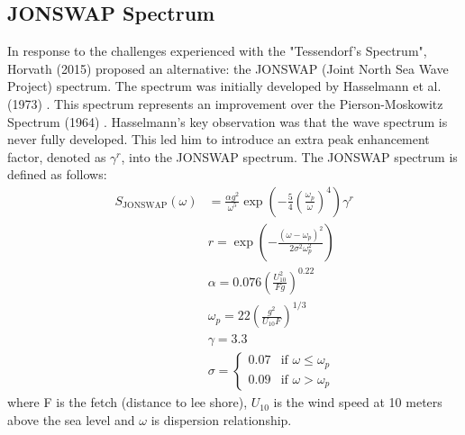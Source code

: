 \subsection{JONSWAP Spectrum}
In response to the challenges experienced with the "Tessendorf's Spectrum", Horvath (2015) \cite{horvath2015} proposed an alternative: the JONSWAP (Joint North Sea Wave Project) spectrum. The spectrum was initially developed by Hasselmann et al. (1973) \cite{hasselmann1973}. This spectrum represents an improvement over the Pierson-Moskowitz Spectrum (1964) \cite{pierson1964}. Hasselmann's key observation was that the wave spectrum is never fully developed. This led him to introduce an extra peak enhancement factor, denoted as $\gamma^r$, into the JONSWAP spectrum.
The JONSWAP spectrum is defined as follows:
\begin{equation}
    \begin{aligned}
        S_{\text{JONSWAP}}(\omega) &= \frac{\alpha g^{2}}{\omega^{5}} \exp \left(-\frac{5}{4} \left(\frac{\omega_{p}}{\omega}\right)^{4}\right) \gamma^{r} \\
        &r = \exp\left(-\frac{(\omega - \omega_p)^{2}}{2 \sigma^{2}\omega^{2}_p}\right) \\
        &\alpha = 0.076 \left( \frac{U^{2}_{10}}{Fg} \right)^{0.22} \\
        &\omega_p = 22 \left( \frac{g^{2}}{U_{10}F} \right)^{1/3} \\
        &\gamma = 3.3 \\
        &\sigma = 
        \begin{cases} 
        0.07 & \text{if } \omega \leq \omega_p \\
        0.09 & \text{if } \omega > \omega_p
        \end{cases}
    \end{aligned}
\end{equation}
where F is the fetch (distance to lee shore), $U_{10}$ is the wind speed at 10 meters above the sea level and $\omega$ is dispersion relationship.


